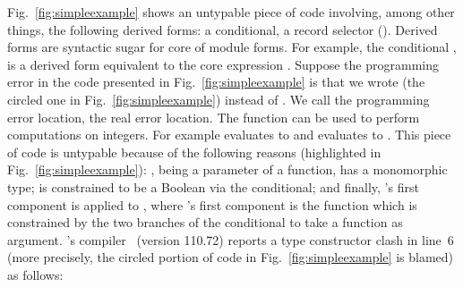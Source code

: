 Fig.~\ref{fig:simpleexample} shows an untypable piece of code
involving, among other things, the following derived forms: a
conditional, a record selector ().
%
Derived forms are syntactic sugar for core of module forms.  For
example,
the conditional
,
is a derived form equivalent to the core
expression .
%
Suppose the programming error in the code presented in
Fig.~\ref{fig:simpleexample} is that we wrote  (the
circled one in Fig.~\ref{fig:simpleexample}) instead of
.
%
We call the programming error location, the real error location.
%
The function  can be used to
perform computations on integers.  For example
 evaluates to
and
 evaluates to
.
%
This piece of code is untypable because of the following reasons
(highlighted in Fig.~\ref{fig:simpleexample}): ,
being a parameter of a function, has a monomorphic type;
 is constrained to be a Boolean via the conditional;
and finally, 's first component is applied to
, where 's first component is the
function  which is constrained by the two branches of
the conditional to take a function as argument.
%
\SML's compiler \SMLNJ\ (version 110.72) reports a type constructor
clash in line~6 (more precisely, the circled portion of code
 in Fig.~\ref{fig:simpleexample} is blamed)
as follows:



